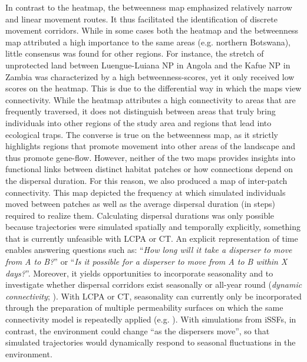 \documentclass[../FinalThesis.tex]{subfiles}
\begin{document}
In contrast to the heatmap, the betweenness map emphasized relatively narrow and
linear movement routes. It thus facilitated the identification of discrete
movement corridors. While in some cases both the heatmap and the betweenness map
attributed a high importance to the same areas (e.g. northern Botswana), little
consensus was found for other regions. For instance, the stretch of unprotected
land between Luengue-Luiana NP in Angola and the Kafue NP in Zambia was
characterized by a high betweenness-scores, yet it only received low scores on
the heatmap. This is due to the differential way in which the maps view
connectivity. While the heatmap attributes a high connectivity to areas that are
frequently traversed, it does not distinguish between areas that truly bring
individuals into other regions of the study area and regions that lead into
ecological traps. The converse is true on the betweenness map, as it strictly
highlights regions that promote movement into other areas of the landscape and
thus promote gene-flow. However, neither of the two maps provides insights into
functional links between distinct habitat patches or how connections depend on
the dispersal duration. For this reason, we also produced a map of inter-patch
connectivity. This map depicted the frequency at which simulated individuals
moved between patches as well as the average dispersal duration (in steps)
required to realize them. Calculating dispersal durations was only possible
because trajectories were simulated spatially and temporally explicitly,
something that is currently unfeasible with LCPA or CT. An explicit
representation of time enables answering questions such as: ``\textit{How long
will it take a disperser to move from A to B?}'' or ``\textit{Is it possible for
a disperser to move from A to B within X days?}''. Moreover, it yields
opportunities to incorporate seasonality and to investigate whether dispersal
corridors exist seasonally or all-year round (\textit{dynamic connectivity};
\citealp{Zeller.2020}). With LCPA or CT, seasonality can currently only be
incorporated through the preparation of multiple permeability surfaces on which
the same connectivity model is repeatedly applied (e.g. \citealp{Osipova.2019}).
With simulations from iSSFs, in contrast, the environment could change ``as the
dispersers move'', so that simulated trajectories would dynamically respond to
seasonal fluctuations in the environment.
\end{document}
